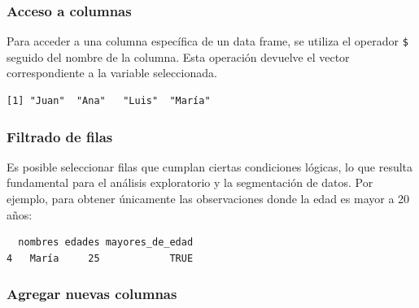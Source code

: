 \documentclass[
  spanish,
  a4paper,
  DIV=11,
  numbers=noendperiod,
  onepage,
  openany]{scrreprt}
\newenvironment{Shaded}{\begin{snugshade}}{\end{snugshade}}
\newcommand{\CommentTok}[1]{\textcolor[rgb]{0.37,0.37,0.37}{#1}}
\newcommand{\DecValTok}[1]{\textcolor[rgb]{0.68,0.00,0.00}{#1}}
\newcommand{\NormalTok}[1]{\textcolor[rgb]{0.00,0.23,0.31}{#1}}
\newcommand{\OtherTok}[1]{\textcolor[rgb]{0.00,0.23,0.31}{#1}}
\newcommand{\SpecialCharTok}[1]{\textcolor[rgb]{0.37,0.37,0.37}{#1}}
\begin{document}
\subsubsection{\texorpdfstring{\textbf{Acceso a
columnas}}{Acceso a columnas}}\label{acceso-a-columnas}

Para acceder a una columna específica de un data frame, se utiliza el
operador \texttt{\$} seguido del nombre de la columna. Esta operación
devuelve el vector correspondiente a la variable seleccionada.

\begin{Shaded}
\end{Shaded}

\begin{verbatim}
[1] "Juan"  "Ana"   "Luis"  "María"
\end{verbatim}

\subsubsection{\texorpdfstring{\textbf{Filtrado de
filas}}{Filtrado de filas}}\label{filtrado-de-filas}

Es posible seleccionar filas que cumplan ciertas condiciones lógicas, lo
que resulta fundamental para el análisis exploratorio y la segmentación
de datos. Por ejemplo, para obtener únicamente las observaciones donde
la edad es mayor a 20 años:

\begin{Shaded}
\end{Shaded}

\begin{verbatim}
  nombres edades mayores_de_edad
4   María     25            TRUE
\end{verbatim}

\subsubsection{Agregar nuevas columnas}\label{agregar-nuevas-columnas}
\end{document}
